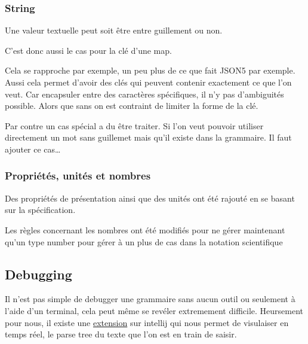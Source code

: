 \documentclass[
    iict, %
    il, %
]{heig-tb}
\begin{document}
\subsubsection{String}
Une valeur textuelle peut soit être entre guillement ou non.

C'est donc aussi le cas pour la clé d'une map.

Cela se rapproche par exemple, un peu plus de ce que fait JSON5 par exemple. %
Aussi cela permet d'avoir des clés qui peuvent contenir exactement ce que l'on veut.
Car encapsuler entre des caractères spécifiques, il n'y pas d'ambiguités possible. Alors que sans on est contraint de limiter la forme de la clé.

Par contre un cas spécial a du être traiter. Si l'on veut pouvoir utiliser directement un mot sans guillemet mais qu'il existe dans la grammaire.
Il faut ajouter ce cas\dots


\subsubsection{Propriétés, unités et nombres}

Des propriétés de présentation %
ainsi que des unités ont été rajouté en se basant sur la spécification.

Les règles concernant les nombres ont été modifiés pour ne gérer maintenant qu'un type number
pour gérer à un plus de cas dans la notation scientifique




\subsection{Debugging}

Il n'est pas simple de debugger une grammaire sans aucun outil ou seulement à l'aide d'un terminal, cela peut même se revéler extremement difficile.
Heursement pour nous, il existe une \href{https://plugins.jetbrains.com/plugin/7358-antlr-v4}{extension} sur intellij qui nous permet de visulaiser en temps réel, le parse tree du texte que l'on est en train de saisir.
\end{document}
